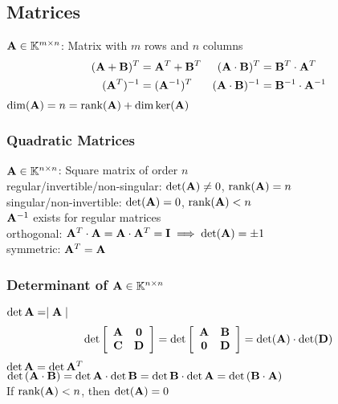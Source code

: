 \begin{mdframed}[style=eqbox]
\subsection{Matrices}
$\mathbf{A} \in \mathbb{K}^{m \times n} $: Matrix with $m$ rows and $n$ columns
\begin{align*}
  (\mathbf{A} + \mathbf{B})^T &= \mathbf{A}^T + \mathbf{B}^T & (\mathbf{A} \cdot \mathbf{B})^T &= \mathbf{B}^T \cdot \mathbf{A}^T \\
  (\mathbf{A}^T)^{-1} &= (\mathbf{A}^{ - 1})^T & (\mathbf{A} \cdot \mathbf{B})^{-1} &= \mathbf{B}^{-1} \cdot \mathbf{A}^{-1}
\end{align*}
$\dim(\mathbf{A}) = n = \text{rank}(\mathbf{A}) + \dim \text{ker}(\mathbf{A})$

\subsubsection{Quadratic Matrices}
$\mathbf{A} \in \mathbb{K}^{n \times n}$: Square matrix of order $n$\\[0.25em]
regular/invertible/non-singular: $\det(\mathbf{A}) \neq 0$, $\text{rank}(\mathbf{A}) = n$\\
singular/non-invertible: $\det(\mathbf{A}) = 0$, $\text{rank}(\mathbf{A}) < n$\\
$\mathbf{A}^{-1}$ exists for regular matrices\\[0.25em]
orthogonal: $\mathbf{A}^T \cdot \mathbf{A} = \mathbf{A} \cdot \mathbf{A}^T = \mathbf{I} \implies \det(\mathbf{A}) = \pm 1$\\[0.25em]
symmetric: $\mathbf{A}^T = \mathbf{A}$

\subsubsection{Determinant of $\mathbf{A} \in \mathbb{K}^{n \times n}$}
$\det{\mathbf{A}} = \mid \mathbf{A} \mid$
\begin{align*}
  \det \left[\begin{array}{cc}
    \mathbf{A} & \mathbf{0} \\
    \mathbf{C} & \mathbf{D}
  \end{array}\right] &= \det \left[\begin{array}{cc}
    \mathbf{A} & \mathbf{B} \\
    \mathbf{0} & \mathbf{D}
  \end{array}\right] = \det(\mathbf{A}) \cdot \det(\mathbf{D})\\
\end{align*}
$\det{\mathbf{A}} = \det{\mathbf{A}^T}$\\
$\det{(\mathbf{A} \cdot \mathbf{B})} = \det{\mathbf{A}} \cdot \det{\mathbf{B}} = \det{\mathbf{B}} \cdot \det{\mathbf{A}} = \det{(\mathbf{B} \cdot \mathbf{A})}$\\[0.25em]
If $\text{rank}(\mathbf{A}) < n$, then $\det(\mathbf{A}) = 0$


\end{mdframed}
